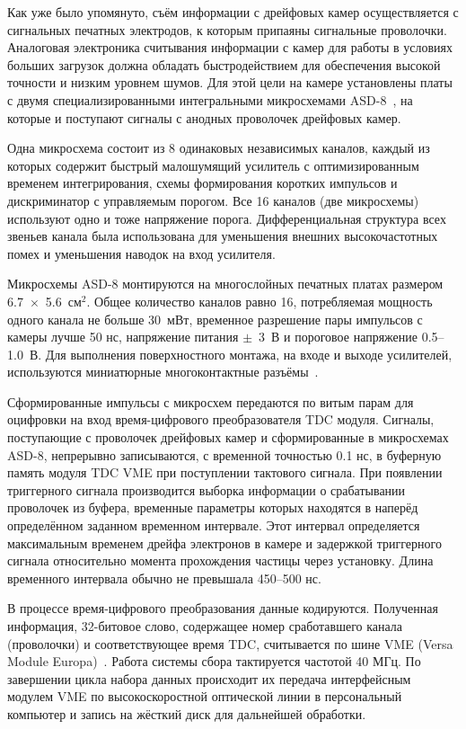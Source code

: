 Как уже было упомянуто, съём информации с дрейфовых камер осуществляется
с сигнальных печатных электродов, к которым припаяны сигнальные проволочки.
Аналоговая электроника считывания информации с камер для работы в условиях
больших загрузок должна обладать быстродействием для обеспечения высокой
точности и низким уровнем шумов. Для этой цели на камере установлены платы с
двумя специализированными интегральными микросхемами ASD-8~\cite{snowmass99}, на
которые и поступают сигналы с анодных проволочек дрейфовых камер.

Одна микросхема состоит из 8 одинаковых независимых каналов, каждый из которых
содержит быстрый малошумящий усилитель с оптимизированным временем
интегрирования, схемы формирования коротких импульсов и дискриминатор с
управляемым порогом. Все 16 каналов (две микросхемы) используют одно и тоже
напряжение порога. Дифференциальная структура всех звеньев канала была
использована для уменьшения внешних высокочастотных помех и уменьшения наводок
на вход усилителя.

Микросхемы ASD-8 монтируются на многослойных печатных платах размером
6.7~$\times$~5.6~см$^2$. Общее количество каналов равно 16, потребляемая
мощность одного канала не больше 30~мВт, временное разрешение пары импульсов с
камеры лучше 50 нс, напряжение питания $\pm$~3~В и пороговое напряжение
0.5--1.0~В. Для выполнения поверхностного монтажа, на входе и выходе усилителей,
используются миниатюрные многоконтактные разъёмы~\cite{badura00}.

Сформированные импульсы с микросхем передаются по витым парам для оцифровки
на вход время-цифрового преобразователя TDC модуля. Сигналы, поступающие с
проволочек дрейфовых камер и сформированные в микросхемах ASD-8, непрерывно
записываются, с временной точностью 0.1 нс, в буферную память модуля TDC VME при
поступлении тактового сигнала. При появлении триггерного сигнала производится
выборка информации о срабатывании проволочек из буфера, временные параметры
которых находятся в наперёд определённом заданном временном интервале. Этот
интервал определяется максимальным временем дрейфа электронов в камере и
задержкой триггерного сигнала относительно момента прохождения частицы через
установку. Длина временного интервала обычно не превышала 450--500 нс.

В процессе время-цифрового преобразования данные кодируются. Полученная
информация, 32-битовое слово, содержащее номер сработавшего канала (проволочки)
и соответствующее время TDC, считывается по шине VME (Versa Module
Europa)~\cite{smirnov97}. Работа системы сбора тактируется частотой 40 МГц. По
завершении цикла набора данных происходит их передача интерфейсным модулем VME
по высокоскоростной оптической линии в персональный компьютер и запись на
жёсткий диск для дальнейшей обработки.

